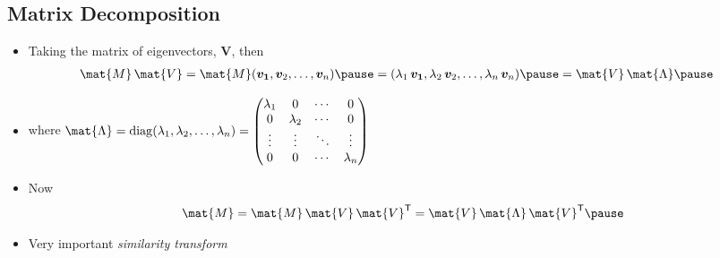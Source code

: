 \documentclass[25pt,landscape,footrule]{foils}
\begin{document}
\begin{slide}
\section[-2]{Matrix Decomposition}

\begin{PauseHighLight}
  \begin{itemize}
  \item Taking the matrix of eigenvectors, $\bm{V}$, then
    \begin{align*}
      \mat{M}\, \mat{V}  &= \mat{M} (\bm{v_1},\bm{v}_2,\ldots,\bm{v}_n)\pause
      =
      (\lambda_1\,\bm{v_1},\lambda_2\,\bm{v}_2,\ldots,\lambda_n\,\bm{v}_n)\pause
      = \mat{V} \,\mat{\Lambda}\pause
    \end{align*}
  \item where $\mat{\Lambda} = \mathrm{diag}(\lambda_1,
    \lambda_2,\ldots, \lambda_n) =
    \begin{pmatrix}
      \lambda_1 & 0 & \cdots & 0 \\
      0 & \lambda_2  & \cdots & 0 \\
      \vdots & \vdots &\ddots &\vdots \\
      0 & 0 & \cdots & \lambda_n
    \end{pmatrix}$\pause
  \item Now
    \begin{align*}
      \mat{M} = \mat{M}\, \mat{V} \, \mat{V}^\tr = \mat{V}
      \,\mat{\Lambda} \, \mat{V}^\tr \pause
    \end{align*}
  \item Very important \textit{similarity transform}\pause
  \end{itemize}
\end{PauseHighLight}

\end{slide}


\end{document}
